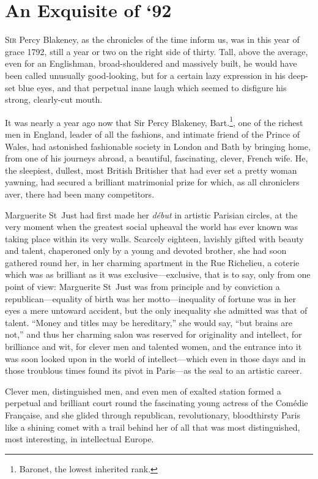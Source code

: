
\chapter{An Exquisite of `92}
\lettrine[lines=4]{S}{ir} Percy Blakeney, as the chronicles of the time inform us, was in this year of grace 1792, still a year or two on the right side of thirty. Tall, above the average, even for an Englishman, broad-shouldered and massively built, he would have been called unusually good-looking, but for a certain lazy expression in his deep-set blue eyes, and that perpetual inane laugh which seemed to disfigure his strong, clearly-cut mouth.

It was nearly a year ago now that Sir Percy Blakeney, Bart.\footnote{Baronet, the lowest inherited rank.}, one of the richest men in England, leader of all the fashions, and intimate friend of the Prince of Wales, had astonished fashionable society in London and Bath by bringing home, from one of his journeys abroad, a beautiful, fascinating, clever, French wife. He, the sleepiest, dullest, most British Britisher that had ever set a pretty woman yawning, had secured a brilliant matrimonial prize for which, as all chroniclers aver, there had been many competitors.

Marguerite St~Just had first made her \textit{début} in artistic Parisian circles, at the very moment when the greatest social upheaval the world has ever known was taking place within its very walls. Scarcely eighteen, lavishly gifted with beauty and talent, chaperoned only by a young and devoted brother, she had soon gathered round her, in her charming apartment in the Rue Richelieu, a coterie which was as brilliant as it was exclusive---exclusive, that is to say, only from one point of view: Marguerite St~Just was from principle and by conviction a republican---equality of birth was her motto---inequality of fortune was in her eyes a mere untoward accident, but the only inequality she admitted was that of talent. \enquote{Money and titles may be hereditary,} she would say, \enquote{but brains are not,} and thus her charming salon was reserved for originality and intellect, for brilliance and wit, for clever men and talented women, and the entrance into it was soon looked upon in the world of intellect---which even in those days and in those troublous times found its pivot in Paris---as the seal to an artistic career.

Clever men, distinguished men, and even men of exalted station formed a perpetual and brilliant court round the fascinating young actress of the Comédie Française, and she glided through republican, revolutionary, bloodthirsty Paris like a shining comet with a trail behind her of all that was most distinguished, most interesting, in intellectual Europe.

